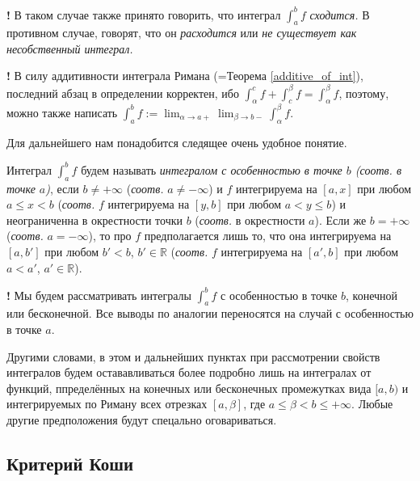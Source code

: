 \begin{mydanger}{\bf !}
    В таком случае также принято говорить, что интеграл $\int_a^b f$ \textit{сходится.} В противном случае, говорят, что он \textit{расходится} или \textit{не существует как несобственный интеграл.}
\end{mydanger}

\begin{mydangerr}{\bf !}
    В силу аддитивности интеграла Римана (=Теорема \ref{additive_of_int}), последний абзац в определении корректен, ибо $\int_\alpha^c f + \int_c^\beta f = \int_\alpha^\beta f$, поэтому, можно также написать $\int_a^b f := \lim_{\alpha \to a+} \lim_{\beta \to b-} \int_\alpha^\beta f.$
\end{mydangerr}

Для дальнейшего нам понадобится следящее очень удобное понятие.

\begin{definition}
    Интеграл $\int_a^b f$ будем называть \textit{интегралом с особенностью в точке $b$ (соотв. в точке $a$)}, если $b \ne + \infty$ (\textit{соотв.} $a \ne - \infty$) и $f$ интегрируема на $[a,x]$ при любом $a\le x <b$ (\textit{соотв.} $f$ интегрируема на $[y,b]$ при любом $a < y \le b$) и неограниченна в окрестности точки $b$ (\textit{соотв.} в окрестности $a$). Если же $b = + \infty$ (\textit{соотв.} $a = - \infty$), то про $f$ предполагается лишь то, что она интегрируема на $[a,b']$ при любом $b' < b$, $b' \in \mathbb{R}$ (\textit{соотв.} $f$ интегрируема на $[a',b]$ при любом $a < a'$, $a' \in \mathbb{R}$).
\end{definition}

\begin{mydangerr}{\bf !}
    Мы будем рассматривать интегралы $\int_a^bf$ с особенностью в точке $b$, конечной или бесконечной. Все выводы по аналогии переносятся на случай с особенностью в точке $a.$ 
\end{mydangerr}

Другими словами, в этом и дальнейших пунктах при рассмотрении свойств интегралов будем остававливаться более подробно лишь на интегралах от функций, ппределённых на конечных или бесконечных промежутках вида $[a,b)$ и интегрируемых по Риману всех отрезках $[a,\beta]$, где $a \le \beta < b \le +\infty.$ Любые другие предположения будут спецально оговариваться.




\subsection{Критерий Коши}

